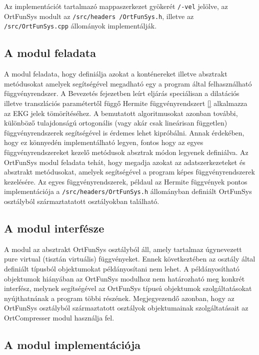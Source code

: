 \documentclass[oneside,titlepage,12pt,a4paper]{report}
\begin{document}
Az implementációt tartalmazó mappaszerkezet gyökerét \texttt{/-vel} jelölve, az OrtFunSys modult  az \texttt{/src/headers
/OrtFunSys.h}, illetve az \texttt{/src/OrtFunSys.cpp} állományok implementálják.

\subsection*{A modul feladata}

\par A modul feladata, hogy definiálja azokat a konténereket illetve absztrakt metódusokat amelyek segítségével 
megadható egy a program által felhasználható függvényrendszer. A Bevezetés fejezetben leírt eljárás speciálisan a dilatációs illetve transzlációs paramétertől függő Hermite függvényrendszert \eqref{} alkalmazza az EKG jelek tömörítéséhez. A bemutatott algoritmusokat azonban további, különböző tulajdonságú ortogonális (vagy akár csak lineárisan független) 
függvényrendszerek segítségével is érdemes lehet kipróbálni. Annak érdekében, hogy ez könnyedén implementálható legyen, fontos hogy az egyes függvényrendszereket kezelő metódusok absztrak módon legyenek definiálva.
Az OrtFunSys modul feladata tehát, hogy megadja azokat az adatszerkezeteket és absztrakt metódusokat, amelyek segítségével a program képes függvényrendszerek kezelésére. Az egyes függvényrendszerek, példaul az Hermite függvények pontos implementációja
a \texttt{/src/headers/OrtFunSys.h} állományban definiált OrtFunSys osztályból származtatatott osztályokban található. 


\subsection*{A modul interfésze}

\par A modul az absztrakt OrtFunSys osztályból áll, amely tartalmaz úgynevezett pure virtual (tisztán virtuális) függvényeket. Ennek következtében az osztály által definiált típusból objektumokat példányosítani nem lehet. A példányosítható objektumok hiányában
az OrtFunSys modulhoz nem határozható meg konkrét interfész, melynek segítségével az OrtFunSys típusú objektumok szolgáltatásokat nyújthatnának a program többi részének. Megjegyezendő azonban, hogy az OrtFunSys osztályból származtatott osztályok objektumainak szolgáltatásait az OrtCompresser
modul használja fel. 

\subsection*{A modul implementációja}
\end{document}
